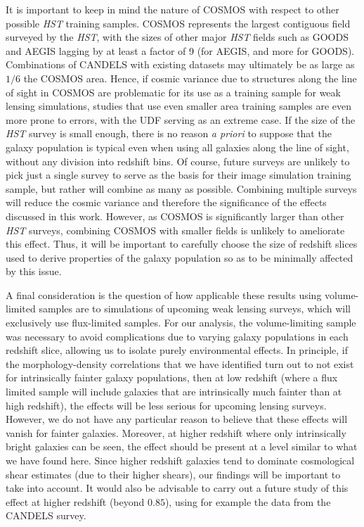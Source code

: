 \documentclass[twocolumn,useAMS,usenatbib]{mn2e}
\begin{document}
It is important to keep in mind the nature of COSMOS with respect to
other possible {\em HST} training samples.  COSMOS represents the
largest contiguous field surveyed by the {\em HST}, with the sizes of
other major {\em HST} fields such as GOODS and AEGIS lagging by at least a
factor of 9 (for AEGIS, and more for GOODS).  Combinations
  of CANDELS with existing datasets may ultimately be as large as
  $1/6$ the COSMOS area.
Hence, if cosmic variance due to structures along 
the line of sight in COSMOS are problematic for its use as a training
sample for weak lensing simulations, studies that use even smaller
area training samples are even more prone to errors, with the UDF
serving as an extreme case.  If the size of the {\em HST} survey is
small enough, there is no reason {\em a priori} to suppose that the
galaxy population is typical even when using all galaxies along the
line of sight, without any division into redshift bins.  Of course,
future surveys are unlikely to pick just a single survey to serve as
the basis for their image simulation training sample, but rather
will combine as many as possible.  Combining multiple surveys will
reduce the cosmic variance and therefore the significance of the
effects discussed in this work.
However, as COSMOS is significantly larger than other \emph{HST} surveys, combining COSMOS with smaller fields is unlikely to ameliorate this effect.
Thus, it will be important to carefully choose the size of redshift slices used to
derive properties of the galaxy population so as to be minimally
affected by this issue.

A final consideration is the question of how applicable these results
using volume-limited samples are to simulations of upcoming weak
lensing surveys, which will exclusively use flux-limited samples.  For
our analysis, the volume-limiting sample was necessary to avoid
complications due to varying galaxy populations in each redshift
slice, allowing us to isolate purely environmental effects.  In
principle, if the morphology-density correlations that we have
identified turn out to not exist for intrinsically fainter galaxy
populations, then at low redshift (where a flux limited sample will
include galaxies that are intrinsically much fainter than at high
redshift), the effects will be less serious for upcoming lensing
surveys.  However, we do not have any particular reason to believe
that these effects will vanish for fainter galaxies.  Moreover, at
higher redshift where only intrinsically bright galaxies can be seen,
the effect should be present at a level similar to what we have found
here.  Since higher redshift galaxies tend to dominate cosmological
shear estimates (due to their higher shears), our findings will be
important to take into account.  It would also be advisable to
  carry out a future study of this effect at higher redshift (beyond
  $0.85$), using for example the data from the CANDELS survey.
\end{document}
